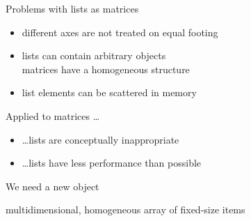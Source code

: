 \documentclass[svgnames]{beamer}
\begin{document}
\begin{frame}{Problems with lists as matrices}
 \begin{itemize}
  \item different axes are not treated on equal footing
  \item lists can contain arbitrary objects\\
        matrices have a homogeneous structure
  \item list elements can be scattered in memory
 \end{itemize}

 \vspace{0.3truecm}
 Applied to matrices \dots
 \begin{itemize}
  \item[] \dots lists are conceptually inappropriate
  \item[] \dots lists have less performance than possible
 \end{itemize}
\end{frame}

\begin{frame}{We need a new object}

 \begin{center}

  \vspace{0.5truecm}
  multidimensional, homogeneous array of fixed-size items
 \end{center}
\end{frame}
\end{document}
